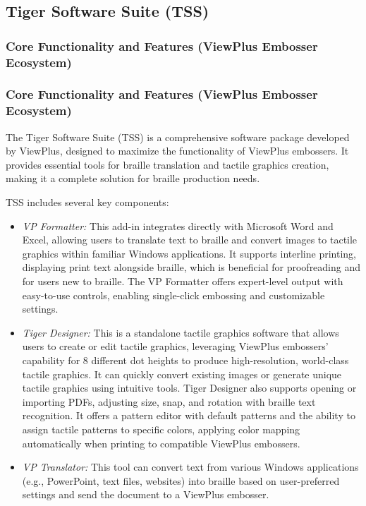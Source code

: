 \subsection{Tiger Software Suite (TSS)}

\subsubsection{Core Functionality and Features (ViewPlus Embosser Ecosystem)}

\subsubsection{Core Functionality and Features (ViewPlus Embosser Ecosystem)}

The Tiger Software Suite (TSS) is a comprehensive software package developed by ViewPlus, designed to maximize the functionality of ViewPlus embossers. \cite{EmeraldCoast,ElitaManual,DuxburyProducts,NimProQuick} It provides essential tools for braille translation and tactile graphics creation, making it a complete solution for braille production needs. \cite{EmeraldCoast,DuxburyProducts}

TSS includes several key components:
\begin{itemize}
    \item \emph{VP Formatter:} This add-in integrates directly with Microsoft Word and Excel, allowing users to translate text to braille and convert images to tactile graphics within familiar Windows applications. \cite{EmeraldCoast,ElitaManual,NimProQuick} It supports interline printing, displaying print text alongside braille, which is beneficial for proofreading and for users new to braille. \cite{EmeraldCoast} The VP Formatter offers expert-level output with easy-to-use controls, enabling single-click embossing and customizable settings. \cite{EmeraldCoast,NimProQuick}
    \item \emph{Tiger Designer:} This is a standalone tactile graphics software that allows users to create or edit tactile graphics, leveraging ViewPlus embossers' capability for 8 different dot heights to produce high-resolution, world-class tactile graphics. \cite{EmeraldCoast,ElitaManual,DuxburyProducts,NimProQuick} It can quickly convert existing images or generate unique tactile graphics using intuitive tools. \cite{EmeraldCoast,NimProQuick} Tiger Designer also supports opening or importing PDFs, adjusting size, snap, and rotation with braille text recognition. \cite{ElitaManual} It offers a pattern editor with default patterns and the ability to assign tactile patterns to specific colors, applying color mapping automatically when printing to compatible ViewPlus embossers. \cite{ElitaManual}
    \item \emph{VP Translator:} This tool can convert text from various Windows applications (e.g., PowerPoint, text files, websites) into braille based on user-preferred settings and send the document to a ViewPlus embosser. \cite{EmeraldCoast,NimProQuick}
\end{itemize}

